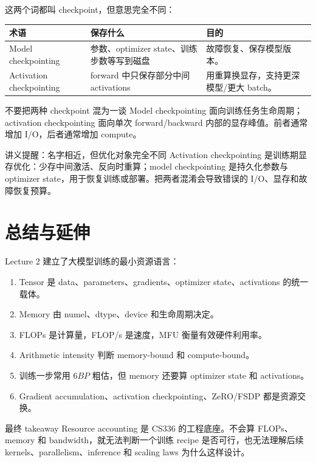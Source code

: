 \documentclass[a4paper]{article}
\begin{document}
这两个词都叫 checkpoint，但意思完全不同：

\begin{longtable}{p{}p{}p{}}
\toprule
\textbf{术语} & \textbf{保存什么} & \textbf{目的} \\
\midrule
Model checkpointing & 参数、optimizer state、训练步数等写到磁盘 & 故障恢复、保存模型版本。 \\
Activation checkpointing & forward 中只保存部分中间 activations & 用重算换显存，支持更深模型/更大 batch。 \\
\bottomrule
\end{longtable}

\begin{warningbox}{不要把两种 checkpoint 混为一谈}
Model checkpointing 面向训练任务生命周期；activation checkpointing 面向单次 forward/backward 内部的显存峰值。前者通常增加 I/O，后者通常增加 compute。
\end{warningbox}

\begin{knowledgebox}{讲义提醒：名字相近，但优化对象完全不同}
Activation checkpointing 是训练期显存优化：少存中间激活、反向时重算；model checkpointing 是持久化参数与 optimizer state，用于恢复训练或部署。把两者混淆会导致错误的 I/O、显存和故障恢复预算。
\end{knowledgebox}

\section{总结与延伸}

Lecture 2 建立了大模型训练的最小资源语言：

\begin{enumerate}
    \item Tensor 是 data、parameters、gradients、optimizer state、activations 的统一载体。
    \item Memory 由 numel、dtype、device 和生命周期决定。
    \item FLOPs 是计算量，FLOP/s 是速度，MFU 衡量有效硬件利用率。
    \item Arithmetic intensity 判断 memory-bound 和 compute-bound。
    \item 训练一步常用 \(6BP\) 粗估，但 memory 还要算 optimizer state 和 activations。
    \item Gradient accumulation、activation checkpointing、ZeRO/FSDP 都是资源交换。
\end{enumerate}

\begin{importantbox}{最终 takeaway}
Resource accounting 是 CS336 的工程底座。不会算 FLOPs、memory 和 bandwidth，就无法判断一个训练 recipe 是否可行，也无法理解后续 kernels、parallelism、inference 和 scaling laws 为什么这样设计。
\end{importantbox}
\end{document}
